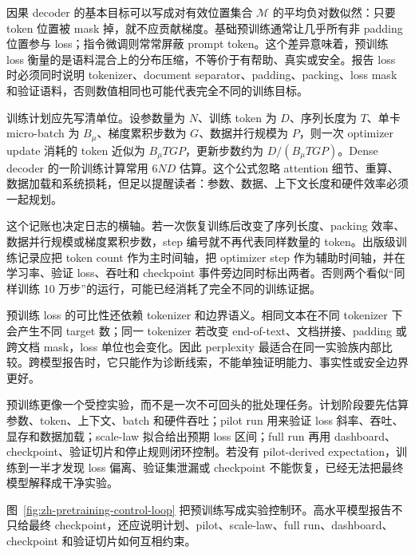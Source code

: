 \documentclass[UTF8,zihao=-4,openany]{ctexbook}
\begin{document}
因果 decoder 的基本目标可以写成对有效位置集合 $\mathcal{M}$ 的平均负对数似然：只要 token 位置被 mask 掉，就不应贡献梯度。基础预训练通常让几乎所有非 padding 位置参与 loss；指令微调则常常屏蔽 prompt token。这个差异意味着，预训练 loss 衡量的是语料混合上的分布压缩，不等价于有帮助、真实或安全。报告 loss 时必须同时说明 tokenizer、document separator、padding、packing、loss mask 和验证语料，否则数值相同也可能代表完全不同的训练目标。

训练计划应先写清单位。设参数量为 $N$、训练 token 为 $D$、序列长度为 $T$、单卡 micro-batch 为 $B_{\mu}$、梯度累积步数为 $G$、数据并行规模为 $P$，则一次 optimizer update 消耗的 token 近似为 $B_{\mu}TGP$，更新步数约为 $D/(B_{\mu}TGP)$。Dense decoder 的一阶训练计算常用 $6ND$ 估算。这个公式忽略 attention 细节、重算、数据加载和系统损耗，但足以提醒读者：参数、数据、上下文长度和硬件效率必须一起规划。

这个记账也决定日志的横轴。若一次恢复训练后改变了序列长度、packing 效率、数据并行规模或梯度累积步数，step 编号就不再代表同样数量的 token。出版级训练记录应把 token count 作为主时间轴，把 optimizer step 作为辅助时间轴，并在学习率、验证 loss、吞吐和 checkpoint 事件旁边同时标出两者。否则两个看似“同样训练 10 万步”的运行，可能已经消耗了完全不同的训练证据。

预训练 loss 的可比性还依赖 tokenizer 和边界语义。相同文本在不同 tokenizer 下会产生不同 target 数；同一 tokenizer 若改变 end-of-text、文档拼接、padding 或跨文档 mask，loss 单位也会变化。因此 perplexity 最适合在同一实验族内部比较。跨模型报告时，它只能作为诊断线索，不能单独证明能力、事实性或安全边界更好。

预训练更像一个受控实验，而不是一次不可回头的批处理任务。计划阶段要先估算参数、token、上下文、batch 和硬件吞吐；pilot run 用来验证 loss 斜率、吞吐、显存和数据加载；scale-law 拟合给出预期 loss 区间；full run 再用 dashboard、checkpoint、验证切片和停止规则闭环控制。若没有 pilot-derived expectation，训练到一半才发现 loss 偏离、验证集泄漏或 checkpoint 不能恢复，已经无法把最终模型解释成干净实验。

图~\ref{fig:zh-pretraining-control-loop} 把预训练写成实验控制环。高水平模型报告不只给最终 checkpoint，还应说明计划、pilot、scale-law、full run、dashboard、checkpoint 和验证切片如何互相约束。
\end{document}
